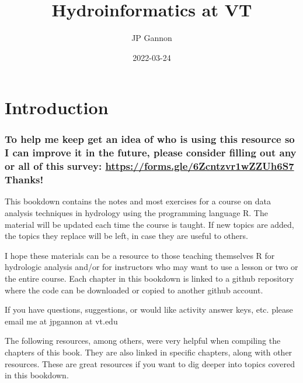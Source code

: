 \documentclass[
]{book}
\title{Hydroinformatics at VT}
\author{JP Gannon}
\date{2022-03-24}
\begin{document}
\maketitle

{
\setcounter{tocdepth}{1}
\tableofcontents
}
\hypertarget{introduction}{%
\chapter{Introduction}\label{introduction}}

\hypertarget{to-help-me-keep-get-an-idea-of-who-is-using-this-resource-so-i-can-improve-it-in-the-future-please-consider-filling-out-any-or-all-of-this-survey-httpsforms.gle6zcntzvr1wzzuh6s7-thanks}{%
\subsection{\texorpdfstring{To help me keep get an idea of who is using this resource so I can improve it in the future, please consider filling out any or all of this survey: \url{https://forms.gle/6Zcntzvr1wZZUh6S7} Thanks!}{To help me keep get an idea of who is using this resource so I can improve it in the future, please consider filling out any or all of this survey: https://forms.gle/6Zcntzvr1wZZUh6S7 Thanks!}}\label{to-help-me-keep-get-an-idea-of-who-is-using-this-resource-so-i-can-improve-it-in-the-future-please-consider-filling-out-any-or-all-of-this-survey-httpsforms.gle6zcntzvr1wzzuh6s7-thanks}}

This bookdown contains the notes and most exercises for a course on data analysis techniques in hydrology using the programming language R. The material will be updated each time the course is taught. If new topics are added, the topics they replace will be left, in case they are useful to others.

I hope these materials can be a resource to those teaching themselves R for hydrologic analysis and/or for instructors who may want to use a lesson or two or the entire course. Each chapter in this bookdown is linked to a github repository where the code can be downloaded or copied to another github account.

If you have questions, suggestions, or would like activity answer keys, etc. please email me at jpgannon at vt.edu

The following resources, among others, were very helpful when compiling the chapters of this book. They are also linked in specific chapters, along with other resources. These are great resources if you want to dig deeper into topics covered in this bookdown.
\end{document}
